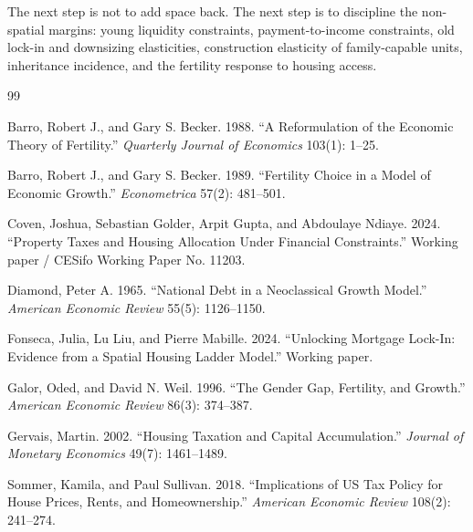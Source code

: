 \documentclass[11pt]{article}
\newcommand{\1}{\mathbf 1}
\begin{document}
The next step is not to add space back. The next step is to discipline the non-spatial margins: young liquidity constraints, payment-to-income constraints, old lock-in and downsizing elasticities, construction elasticity of family-capable units, inheritance incidence, and the fertility response to housing access.

\clearpage
\begin{thebibliography}{99}
\small

Barro, Robert J., and Gary S. Becker. 1988. ``A Reformulation of the Economic Theory of Fertility.'' \emph{Quarterly Journal of Economics} 103(1): 1--25.

Barro, Robert J., and Gary S. Becker. 1989. ``Fertility Choice in a Model of Economic Growth.'' \emph{Econometrica} 57(2): 481--501.

Coven, Joshua, Sebastian Golder, Arpit Gupta, and Abdoulaye Ndiaye. 2024. ``Property Taxes and Housing Allocation Under Financial Constraints.'' Working paper / CESifo Working Paper No. 11203.

Diamond, Peter A. 1965. ``National Debt in a Neoclassical Growth Model.'' \emph{American Economic Review} 55(5): 1126--1150.

Fonseca, Julia, Lu Liu, and Pierre Mabille. 2024. ``Unlocking Mortgage Lock-In: Evidence from a Spatial Housing Ladder Model.'' Working paper.

Galor, Oded, and David N. Weil. 1996. ``The Gender Gap, Fertility, and Growth.'' \emph{American Economic Review} 86(3): 374--387.

Gervais, Martin. 2002. ``Housing Taxation and Capital Accumulation.'' \emph{Journal of Monetary Economics} 49(7): 1461--1489.

Sommer, Kamila, and Paul Sullivan. 2018. ``Implications of US Tax Policy for House Prices, Rents, and Homeownership.'' \emph{American Economic Review} 108(2): 241--274.

\end{thebibliography}
\end{document}

